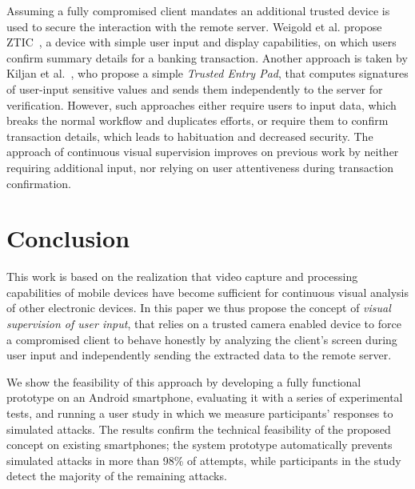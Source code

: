 \documentclass[sigconf, anonymous, balance=false]{acmart}
\newcommand{\myparagraph}[1]{\myparagraphnodot{#1.}}
\newcommand{\myparagraphnodot}[1]{\vspace{4pt} \noindent {\bfseries #1}\xspace}
\newcommand{\sysname}{\textsc{IntegriScreen}\xspace}
\begin{document}
\myparagraph{Trusted devices}
Assuming a fully compromised client mandates an additional trusted device is used to secure the interaction with the remote server.
Weigold et al. propose ZTIC~\cite{weigold2011}, a device with simple user input and display capabilities, on which users confirm summary details for a banking transaction.
Another approach is taken by Kiljan et al.~\cite{6978928}, who propose a simple \emph{Trusted Entry Pad}, that computes signatures of user-input sensitive values and sends them independently to the server for verification.
However, such approaches either require users to input data, which breaks the normal workflow and duplicates efforts, or require them to confirm transaction details, which leads to habituation and decreased security.
The approach of continuous visual supervision improves on previous work by neither requiring additional input, nor relying on user attentiveness during transaction confirmation.


\section{Conclusion} \label{sec:conclusion}

This work is based on the realization that video capture and processing capabilities of mobile devices have become sufficient for continuous visual analysis of other electronic devices.
In this paper we thus propose the concept of \emph{visual supervision of user input}, that relies on a trusted camera enabled device to force a compromised client to behave honestly by analyzing the client's screen during user input and independently sending the extracted data to the remote server.

We show the feasibility of this approach by developing a fully functional prototype on an Android smartphone, evaluating it with a series of experimental tests, and running a user study in which we measure participants' responses to simulated attacks.
The results confirm the technical feasibility of the proposed concept on existing smartphones; the system prototype automatically prevents simulated attacks in more than 98\% of attempts, while participants in the study detect the majority of the remaining attacks.
\end{document}
